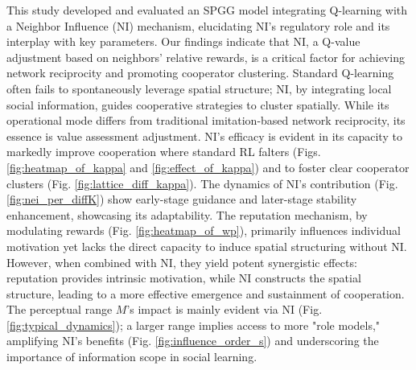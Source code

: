 \documentclass[preprint,number,sort&compress,12pt]{elsarticle}
\begin{document}
This study developed and evaluated an SPGG model integrating Q-learning with a Neighbor Influence (NI) mechanism, elucidating NI's regulatory role and its interplay with key parameters. Our findings indicate that NI, a Q-value adjustment based on neighbors' relative rewards, is a critical factor for achieving network reciprocity and promoting cooperator clustering. Standard Q-learning often fails to spontaneously leverage spatial structure; NI, by integrating local social information, guides cooperative strategies to cluster spatially. While its operational mode differs from traditional imitation-based network reciprocity, its essence is value assessment adjustment. NI's efficacy is evident in its capacity to markedly improve cooperation where standard RL falters (Figs. \ref{fig:heatmap_of_kappa} and \ref{fig:effect_of_kappa}) and to foster clear cooperator clusters (Fig. \ref{fig:lattice_diff_kappa}). The dynamics of NI's contribution (Fig. \ref{fig:nei_per_diffK}) show early-stage guidance and later-stage stability enhancement, showcasing its adaptability. The reputation mechanism, by modulating rewards (Fig. \ref{fig:heatmap_of_wp}), primarily influences individual motivation yet lacks the direct capacity to induce spatial structuring without NI. However, when combined with NI, they yield potent synergistic effects: reputation provides intrinsic motivation, while NI constructs the spatial structure, leading to a more effective emergence and sustainment of cooperation. The perceptual range $M$'s impact is mainly evident via NI (Fig. \ref{fig:typical_dynamics}); a larger range implies access to more "role models," amplifying NI's benefits (Fig. \ref{fig:influence_order_s}) and underscoring the importance of information scope in social learning.
\end{document}
